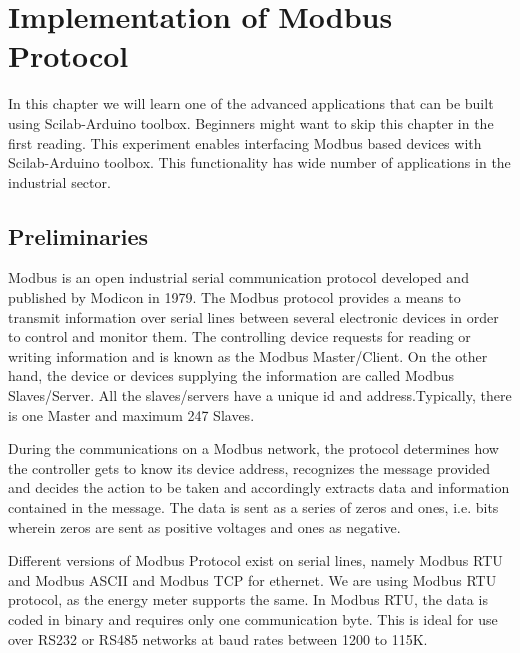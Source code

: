 \chapter {Implementation of Modbus Protocol}
\thispagestyle{empty}
\label{modbus}

\newcommand{\LocMODfig}{\Origin/user-code/modbus/figures}
\newcommand{\LocMODscicode}{\Origin/user-code/modbus/scilab}
\newcommand{\LocMODscibrief}{Origin/user-code/modbus/scilab}
\newcommand{\LocMODardcode}{\Origin/user-code/modbus/arduino}
\newcommand{\LocMODardbrief}{Origin/user-code/modbus/arduino}

In this chapter we will learn one of the advanced applications that can be built using Scilab-Arduino toolbox. Beginners might want to skip this chapter in the first reading. This experiment enables interfacing Modbus based devices with Scilab-Arduino toolbox. This functionality has wide number of applications in the industrial sector.

\section{Preliminaries}
Modbus is an open industrial serial communication protocol developed and published by Modicon in 1979. The Modbus protocol provides a means to transmit information over serial lines between several electronic devices in order to control and monitor them. The controlling device requests for reading or writing information and is known as the Modbus Master/Client. On the other hand, the device or devices supplying the information are called Modbus Slaves/Server. All the slaves/servers have a unique id and address.Typically, there is one Master and maximum 247 Slaves.

During the communications on a Modbus  network, the protocol determines how the controller gets to know its device address, recognizes the message provided and decides the action to be taken and accordingly extracts data and information contained in the message. The data is sent as a series of zeros and ones, i.e. bits wherein zeros are sent as positive voltages and ones as negative.

Different versions of Modbus Protocol exist on serial lines, namely Modbus RTU and Modbus ASCII and Modbus TCP for ethernet. We are using Modbus RTU protocol, as the energy meter supports the same. In Modbus RTU, the data is coded in binary and requires only one communication byte. This is ideal  for use over RS232 or RS485 networks at baud rates between 1200 to 115K.

